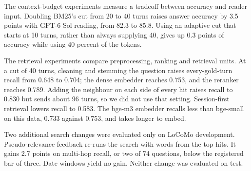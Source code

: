 The context-budget experiments measure a tradeoff between accuracy and reader input. Doubling BM25's cut from 20 to 40 turns raises answer accuracy by 3.5 points with GPT-6 Sol reading, from 82.3 to 85.8. Using an adaptive cut that starts at 10 turns, rather than always supplying 40, gives up 0.3 points of accuracy while using 40 percent of the tokens.

The retrieval experiments compare preprocessing, ranking and retrieval units. At a cut of 40 turns, cleaning and stemming the question raises every-gold-turn recall from 0.648 to 0.704; the dense embedder reaches 0.753, and the reranker reaches 0.789. Adding the neighbour on each side of every hit raises recall to 0.830 but sends about 96 turns, so we did not use that setting. Session-first retrieval lowers recall to 0.583. The bge-m3 embedder recalls less than bge-small on this data, 0.733 against 0.753, and takes longer to embed.

Two additional search changes were evaluated only on LoCoMo development. Pseudo-relevance feedback re-runs the search with words from the top hits. It gains 2.7 points on multi-hop recall, or two of 74 questions, below the registered bar of three. Date windows yield no gain. Neither change was evaluated on test.
